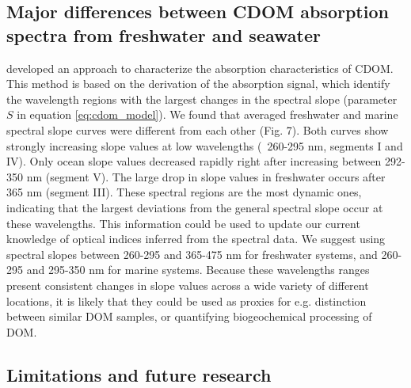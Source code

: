 \subsection*{Major differences between CDOM absorption spectra from freshwater and seawater}

\citet{Loiselle2009} developed an approach to characterize the absorption characteristics of CDOM. This method is based on the derivation of the absorption signal, which identify the wavelength regions with the largest changes in the spectral slope (parameter $S$ in equation \ref{eq:cdom_model}). We found that averaged freshwater and marine spectral slope curves were different from each other (Fig. 7). Both curves show strongly increasing slope values at low wavelengths (~260-295 nm, segments I and IV). Only ocean slope values decreased rapidly right after increasing between 292-350 nm (segment V). The large drop in slope values in freshwater occurs after 365 nm (segment III). These spectral regions are the most dynamic ones, indicating that the largest deviations from the general spectral slope occur at these wavelengths. This information could be used to update our current knowledge of optical indices inferred from the spectral data. We suggest using spectral slopes between 260-295 and 365-475 nm for freshwater systems, and 260-295 and 295-350 nm for marine systems. Because these wavelengths ranges present consistent changes in slope values across a wide variety of different locations, it is likely that they could be used as proxies for e.g. distinction between similar DOM samples, or quantifying biogeochemical processing of DOM.

\subsection*{Limitations and future research}

